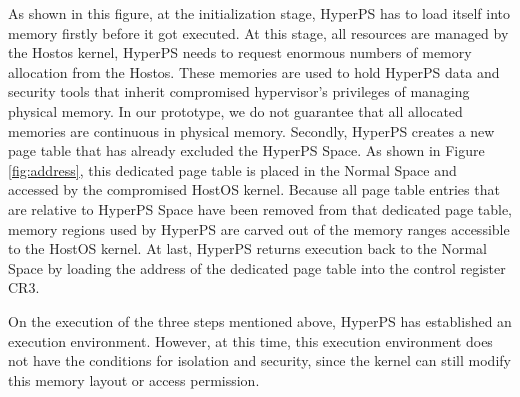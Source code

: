 As shown in this figure, at the initialization stage, HyperPS has to load itself into memory firstly before it got executed. 
At this stage, all resources are managed by the Hostos kernel, HyperPS needs to request enormous numbers of memory allocation from the Hostos. These memories are used to hold HyperPS data and security tools that inherit compromised hypervisor's privileges of managing physical memory. 
In our prototype, we do not guarantee that all allocated memories are continuous in physical memory. 
Secondly, HyperPS creates a new page table that has already excluded the HyperPS Space. As shown in Figure \ref{fig:address}, this dedicated page table is placed in the Normal Space and accessed by the compromised HostOS kernel. 
Because all page table entries that are relative to HyperPS Space have been removed from that dedicated page table, 
memory regions used by HyperPS are carved out of the memory ranges accessible to the HostOS kernel. 
At last, HyperPS returns execution back to the Normal Space by loading the address of the dedicated page table into the control register CR3. 

On the execution of the three steps mentioned above, HyperPS has established an execution environment. 
However, at this time, this execution environment does not have the conditions for isolation and security, since the kernel can still modify this memory layout or access permission. 


